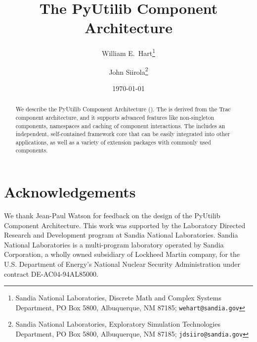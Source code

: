 \documentclass[12pt]{article}
\begin{document}
\title{The PyUtilib Component Architecture}

\author{William E.\ Hart\footnote{Sandia National Laboratories, 
Discrete Math and Complex Systems Department, 
PO Box 5800, Albuquerque, NM 87185;
{\tt wehart@sandia.gov}}
\and
John Siirola\footnote{Sandia National Laboratories,
Exploratory Simulation Technologies Department, 
PO Box 5800, Albuquerque, NM 87185;
{\tt jdsiiro@sandia.gov}}
}

\date{\today}

\maketitle

\begin{abstract}
We describe the PyUtilib Component Architecture (\pca).  The \pcasp is derived from the Trac component architecture, and it supports advanced features like non-singleton components, namespaces and caching of component interactions.  The \pcasp includes an independent, self-contained framework core that can be easily integrated into other applications, as well as a variety of extension packages with 
commonly used components.
\end{abstract}


\lstset{language=Python}
\lstset{aboveskip=1em,belowskip=1em,showspaces=false,showstringspaces=false}

\newpage
\tableofcontents
\newpage






\section*{Acknowledgements} 

We thank Jean-Paul Watson for feedback on the design of the PyUtilib
Component Architecture.  This work was supported by the Laboratory
Directed Research and Development program at Sandia National
Laboratories. Sandia National Laboratories is a multi-program laboratory
operated by Sandia Corporation, a wholly owned subsidiary of Lockheed
Martin company, for   the U.S. Department of Energy's National Nuclear
Security Administration under contract  DE-AC04-94AL85000.



%



\end{document}
